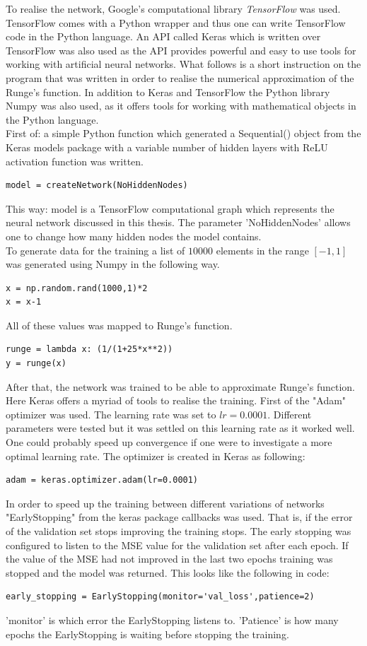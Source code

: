 \documentclass[11pt, letterpaper]{amsart}
\begin{document}
To realise the network, Google's computational library \textit{TensorFlow} was used. TensorFlow comes with a Python wrapper and thus one can write TensorFlow code in the Python language. An API called Keras which is written over TensorFlow was also used as the API provides powerful and easy to use tools for working with artificial neural networks. What follows is a short instruction on the program that was written in order to realise the numerical approximation of the Runge's function. In addition to Keras and TensorFlow the Python library Numpy was also used, as it offers tools for working with mathematical objects in the Python language.
\\

First of: a simple Python function which generated a Sequential() object from the Keras models package with a variable number of hidden layers with ReLU activation function was written. 
\begin{lstlisting}
model = createNetwork(NoHiddenNodes)
\end{lstlisting}
This way: model is a TensorFlow computational graph which represents the neural network discussed in this thesis. The parameter 'NoHiddenNodes' allows one to change how many hidden nodes the model contains.
\\

To generate data for the training a list of $10000$ elements in the range $[-1,1]$ was generated using Numpy in the following way.
\begin{lstlisting}
x = np.random.rand(1000,1)*2
x = x-1
\end{lstlisting}
All of these values was mapped to Runge's function.
\begin{lstlisting}
runge = lambda x: (1/(1+25*x**2))
y = runge(x)
\end{lstlisting}
After that, the network was trained to be able to approximate Runge's function. Here Keras offers a myriad of tools to realise the training. First of the "Adam" optimizer was used. The learning rate was set to $lr = 0.0001$. Different parameters were tested but it was settled on this learning rate as it worked well. One could probably speed up convergence if one were to investigate a more optimal learning rate. The optimizer is created in Keras as following:
\begin{lstlisting}
adam = keras.optimizer.adam(lr=0.0001)
\end{lstlisting}
In order to speed up the training between different variations of networks "EarlyStopping" from the keras package callbacks was used. That is, if the error of the validation set stops improving the training stops. The early stopping was configured to listen to the MSE value for the validation set after each epoch. If the value of the MSE had not improved in the last two epochs training was stopped and the model was returned. This looks like the following in code:
\begin{lstlisting}
early_stopping = EarlyStopping(monitor='val_loss',patience=2)
\end{lstlisting}
'monitor' is which error the EarlyStopping listens to. 'Patience' is how many epochs the EarlyStopping is waiting before stopping the training.
\\
\end{document}
